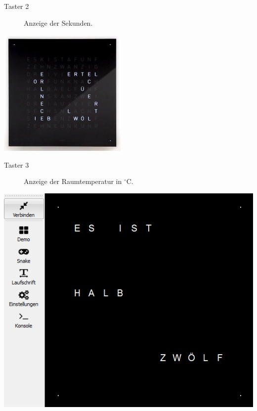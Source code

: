 \begin{multicols}{2}
\begin{description}
\item[Taster 2] Anzeige der Sekunden.
\end {description}
{
\centering
\includegraphics[width=0.8\columnwidth]{Abbildungen/Funktionen/Sekunden_01}

}

\begin{description}
\item[Taster 3] Anzeige der Raumtemperatur in $^\circ$C.
\end {description}
{
\centering
\includegraphics[width=0.8\columnwidth]{Abbildungen/Funktionen/Uhrzeit_01}

}


\end{multicols}
